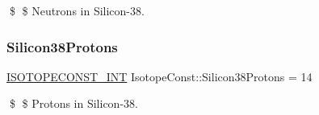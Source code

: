 \$ \$ Neutrons in Silicon-\/38. \mbox{\label{group___isotope_const-_silicon-_si38_gace0f198cd0432f2f703372aa23364110}} 
\subsubsection{\texorpdfstring{Silicon38\+Protons}{Silicon38Protons}}
{\footnotesize\ttfamily \mbox{\hyperlink{group___isotope_const-_macros_ga5f18360b3e99483a35c32d789e62621c}{I\+S\+O\+T\+O\+P\+E\+C\+O\+N\+S\+T\+\_\+\+I\+NT}} Isotope\+Const\+::\+Silicon38\+Protons = 14}

\$ \$ Protons in Silicon-\/38. 